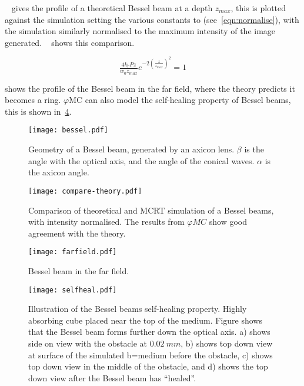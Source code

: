 ~ gives the profile of a theoretical Bessel beam at a depth $z_{max}$, this is plotted against the simulation setting the various constants to (see~\cref{eqn:normalise}), with the simulation similarly normalised to the maximum intensity of the image generated. ~ shows this comparison.

\begin{equation}
\tfrac{4k_rPz}{w_0z_{max}}e^{-2\left(\tfrac{z}{z_{max}}\right)^2}=1
\label{eqn:normalise}
\end{equation}


 shows the profile of the Bessel beam in the far field, where the theory predicts it becomes a ring.
$\varphi$MC can also model the self-healing property of Bessel beams, this is shown in~\cref{fig:selfheal}.

\begin{figure}[!htbp]
    \centering
    \texttt{[image: bessel.pdf]}
    \caption{Geometry of a Bessel beam, generated by an axicon lens. $\beta$ is the angle with the optical axis, and the angle of the conical waves. $\alpha$ is the axicon angle.}
    \label{fig:besselgeo}
\end{figure}


\begin{figure}[!htbp]
    \centering
    \texttt{[image: compare-theory.pdf]}
    \caption{Comparison of theoretical and MCRT simulation of a Bessel beams, with intensity normalised. The results from $\varphi MC$ show good agreement with the theory.}
    \label{fig:besselCompare}
\end{figure}

\begin{figure}[!htbp]
\centering
\texttt{[image: farfield.pdf]}
\caption{Bessel beam in the far field.}
\label{fig:farfield}
\end{figure}

\begin{figure}[!htbp]
\centering
\texttt{[image: selfheal.pdf]}
\caption{Illustration of the Bessel beams self-healing property. Highly absorbing cube placed near the top of the medium. Figure shows that the Bessel beam forms further down the optical axis. a) shows side on view with the obstacle at $0.02~mm$, b) shows top down view at surface of the simulated b=medium before the obstacle, c) shows top down view in the middle of the obstacle, and  d) shows the top down view after the Bessel beam has ``healed''.}
\label{fig:selfheal}
\end{figure}

